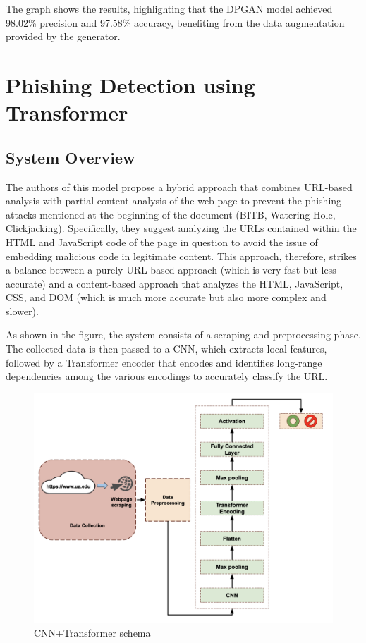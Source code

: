 The graph shows the results, highlighting that the DPGAN model achieved 98.02\% precision and 97.58\% accuracy, benefiting from the data augmentation provided by the generator.

\section{Phishing Detection using Transformer}

\subsection{System Overview}
The authors of this model propose a hybrid approach that combines URL-based analysis with partial content analysis of the web page to prevent the phishing attacks mentioned at the beginning of the document (BITB, Watering Hole, Clickjacking). Specifically, they suggest analyzing the URLs contained within the HTML and JavaScript code of the page in question to avoid the issue of embedding malicious code in legitimate content. This approach, therefore, strikes a balance between a purely URL-based approach (which is very fast but less accurate) and a content-based approach that analyzes the HTML, JavaScript, CSS, and DOM (which is much more accurate but also more complex and slower).

As shown in the figure, the system consists of a scraping and preprocessing phase. The collected data is then passed to a CNN, which extracts local features, followed by a Transformer encoder that encodes and identifies long-range dependencies among the various encodings to accurately classify the URL.

\begin{figure}[htp]
    \centering
    \includegraphics[width=0.8\linewidth]{images/transformer schema.png}
    \caption{CNN+Transformer schema}
    \label{fig:CNN+Transformer schema}
\end{figure}

